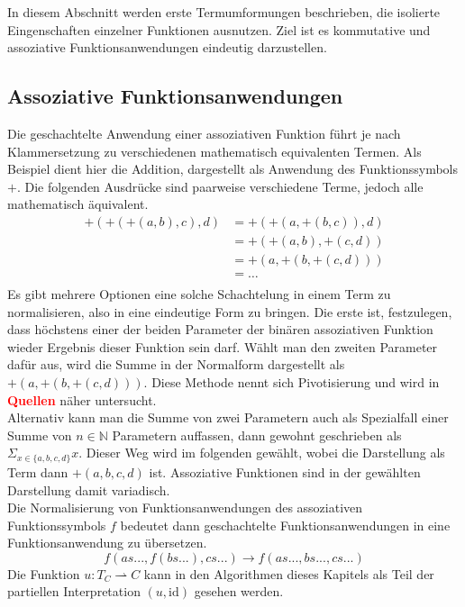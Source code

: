 \documentclass{scrartcl}
\begin{document}
In diesem Abschnitt werden erste Termumformungen beschrieben, die isolierte Eingenschaften einzelner Funktionen ausnutzen. Ziel ist es kommutative und assoziative Funktionsanwendungen eindeutig darzustellen.\\

\subsection {Assoziative Funktionsanwendungen}
Die geschachtelte Anwendung einer assoziativen Funktion führt je nach Klammersetzung zu verschiedenen mathematisch equivalenten Termen. Als Beispiel dient hier die Addition, dargestellt als Anwendung des Funktionssymbols $+$. Die folgenden Ausdrücke sind paarweise verschiedene Terme, jedoch alle mathematisch äquivalent.
\begin{equation*}
	\begin{split}
	+(+(+(a, b), c), d) &= +(+(a, +(b, c)), d)\\
	&= +(+(a, b), +(c, d))\\
	&= +(a, +(b, +(c, d)))\\
	&= \dots \\
	\end{split}
\end{equation*}
Es gibt mehrere Optionen eine solche Schachtelung in einem Term zu normalisieren, also in eine eindeutige Form zu bringen. Die erste ist, festzulegen, dass höchstens einer der beiden Parameter der binären assoziativen Funktion wieder Ergebnis dieser Funktion sein darf. Wählt man den zweiten Parameter dafür aus, wird die Summe in der Normalform dargestellt als $+(a, +(b, +(c, d)))$. Diese Methode nennt sich Pivotisierung und wird in \textcolor{red}{\textbf{Quellen}} näher untersucht.\\
Alternativ kann man die Summe von zwei Parametern auch als Spezialfall einer Summe von $n \in \mathbb{N}$ Parametern auffassen, dann gewohnt geschrieben als $\Sigma_{x \in \{a, b, c, d\}} x$. Dieser Weg wird im folgenden gewählt, wobei die Darstellung als Term dann $+(a, b, c, d)$ ist. Assoziative Funktionen sind in der gewählten Darstellung damit variadisch. \\
Die Normalisierung von Funktionsanwendungen des assoziativen Funktionssymbols $f$ bedeutet dann geschachtelte Funktionsanwendungen in eine Funktionsanwendung zu übersetzen. 
$$f(as..., f(bs...), cs...) \rightarrow f(as..., bs..., cs...)$$
Die Funktion $u \colon T_C \rightharpoonup C$ kann in den Algorithmen dieses Kapitels als Teil der partiellen Interpretation $(u, \mathrm{id})$ gesehen werden. 
\end{document}
